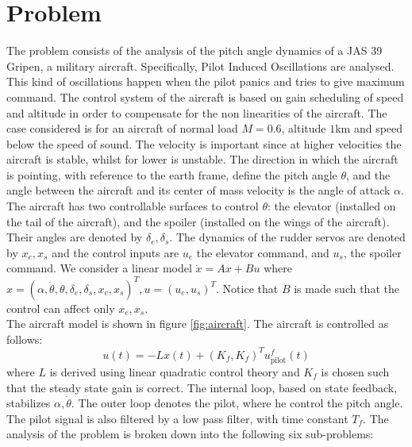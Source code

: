 \section*{Problem}
\label{sec:prob}
The problem consists of the analysis of the pitch angle dynamics of a JAS 39 Gripen, a military aircraft. Specifically, Pilot Induced Oscillations are analysed. This kind of oscillations happen when the pilot panics and tries to give maximum command. The control system of the aircraft is based on gain scheduling  of speed and altitude in order to compensate for the non linearities of the aircraft. The case considered is for an aircraft of normal load $M=0.6$, altitude $1$km and speed below the speed of sound. The velocity is important since at higher velocities the aircraft is stable, whilst for lower is unstable. The direction in which the aircraft is pointing, with reference to the earth frame, define the pitch angle $\theta$, and the angle between the aircraft and its center of mass velocity is the angle of attack $\alpha$.\\ The aircraft has two controllable surfaces to control $\theta$: the elevator (installed on the tail of the aircraft), and the spoiler (installed on the wings of the aircraft). Their angles are denoted by $\delta_e, \delta_s$. The dynamics of the rudder servos are denoted by $x_e, x_s$ and the control inputs are $u_e$ the elevator command, and $u_s$, the spoiler command. We consider a linear model $\dot{x}=Ax+Bu$ where $x=(\alpha, \dot{\theta}, \theta, \delta_e, \delta_s, x_e,x_s)^T, u=(u_e,u_s)^T$. Notice that $B$ is made such that the control can affect only $x_e, x_s$.\\ The aircraft model is shown in figure \ref{fig:aircraft}.
The aircraft is controlled as follows:
$$u(t)=-Lx(t)+(K_f,K_f)^T u_{\text{pilot}}^f(t)$$
where $L$ is derived using linear quadratic control theory and $K_f$ is chosen such that the steady state gain is correct.
The internal loop, based on state feedback, stabilizes $\alpha, \dot{\theta}$. The outer loop denotes the pilot, where he control the pitch angle. The pilot signal is also filtered by a low pass filter, with time constant $T_f$. 
The analysis of the problem is broken down into the following six sub-problems:

